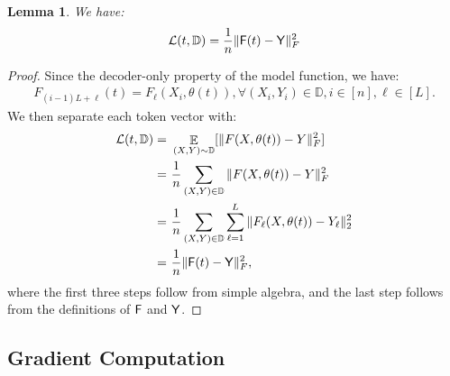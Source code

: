 \documentclass[11pt]{article}
\theoremstyle{plain}
\newtheorem{lemma}[theorem]{Lemma}
\DeclareMathOperator*{\E}{{\mathbb{E}}}
\begin{document}
\begin{lemma}\label{lem:compact_form_transform}
    We have:
    \begin{align*}
        {\cal L}(t, \mathbb{D}) = \frac{1}{n} \| {\sf F}(t) - {\sf Y}\|_F^2
    \end{align*}
\end{lemma}

\begin{proof}
    Since the decoder-only property of the model function, we have:
    \begin{align*}
        F_{(i-1)L+\ell}(t) = F_{\ell}(X_i, \theta(t)), \forall (X_i, Y_i) \in \mathbb{D}, i \in [n], \ell \in [L].
    \end{align*}
    We then separate each token vector with:
    \begin{align*}
        {\cal L}(t, \mathbb{D})
        = & ~ \E_{(X, Y) \sim \mathbb{D}}[ \|F(X, \theta(t)) - Y \|_F^2 ] \\
        = & ~ \frac{1}{n} \sum_{(X, Y) \in \mathbb{D}} \|F(X, \theta(t)) - Y \|_F^2 \\
        = & ~ \frac{1}{n} \sum_{(X, Y) \in \mathbb{D}} \sum_{\ell=1}^L \| F_{\ell}(X, \theta(t)) - Y_\ell\|_2^2 \\
        = & ~ \frac{1}{n} \| {\sf F}(t) - {\sf Y}\|_F^2,
    \end{align*}
    where the first three steps follow from simple algebra, and the last step follows from the definitions of ${\sf F}$ and ${\sf Y}$.
\end{proof}

\subsection{Gradient Computation}
\end{document}
